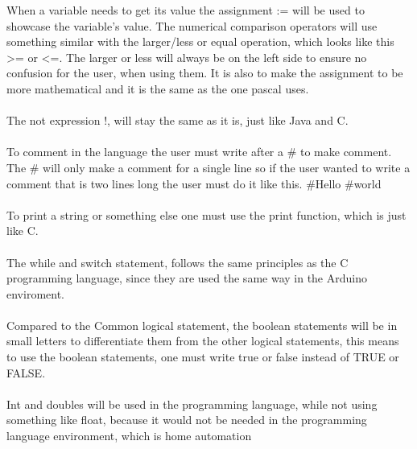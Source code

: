 When a variable needs to get its value the assignment := will be used to showcase the variable's value. The numerical comparison operators will use something similar with the  larger/less or equal operation, which looks like this >= or <=. The larger or less will always be on the left side to ensure no confusion for the user, when using them. It is also to make the assignment to be more mathematical and it is the same as the one pascal uses.  \\
 \\
The not expression !, will stay the same as it is, just like Java and C. \\
 \\
To comment in the language the user must write after a \# to make comment. The \# will only make a comment for a single line so if the user wanted to write a comment that is two lines long the user must do it like this.
\#Hello
\#world \\
 \\
To print a string or something else one must use the print function, which is just like C.\\
 \\

The while and switch statement, follows the same principles as the C programming language, since they are used the same way in the Arduino enviroment.\\
 \\

Compared to the Common logical statement, the boolean statements will be in small letters to differentiate them from the other logical statements, this means to use the boolean statements, one must write true or false instead of TRUE or FALSE.\\
 \\
 Int and doubles will be used in the programming language, while not using something like float, because it would not be needed in the programming language environment, which is home automation